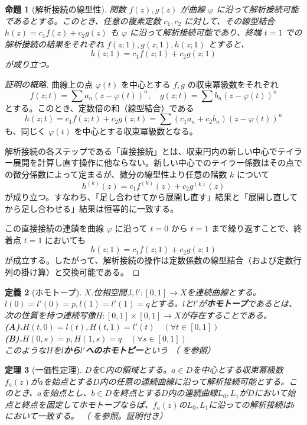\documentclass[paper=a4, fontsize=11pt]{jlreq} %
\theoremstyle{break}
\newtheorem{theorem}{定理}[section]
\newtheorem{definition}[theorem]{定義}
\newtheorem{proposition}[theorem]{命題}
\theoremstyle{qa}
\theoremstyle{remark} %
\begin{document}
\begin{proposition}[解析接続の線型性]\label{prop:analytic_linear}
    関数 $f(z), g(z)$ が曲線 $\varphi$ に沿って解析接続可能であるとする。このとき、任意の複素定数 $c_1, c_2$ に対して、その線型結合 $h(z) = c_1f(z) + c_2g(z)$ も $\varphi$ に沿って解析接続可能であり、終端 $t=1$ での解析接続の結果をそれぞれ $f(z;1), g(z;1), h(z;1)$ とすると、
    $$ h(z;1) = c_1f(z;1) + c_2g(z;1) $$
    が成り立つ。
\end{proposition}

\begin{proof}[証明の概略]
    曲線上の点 $\varphi(t)$ を中心とする $f, g$ の収束冪級数をそれぞれ
    $$ f(z; t) = \sum a_n (z - \varphi(t))^n, \quad g(z; t) = \sum b_n (z - \varphi(t))^n $$
    とする。このとき、定数倍の和（線型結合）である
    $$ h(z; t) = c_1f(z; t) + c_2g(z; t) = \sum (c_1a_n + c_2b_n)(z - \varphi(t))^n $$
    も、同じく $\varphi(t)$ を中心とする収束冪級数となる。
    
    解析接続の各ステップである「直接接続」とは、収束円内の新しい中心でテイラー展開を計算し直す操作に他ならない。新しい中心でのテイラー係数はその点での微分係数によって定まるが、微分の線型性より任意の階数 $k$ について
    $$ h^{(k)}(z) = c_1f^{(k)}(z) + c_2g^{(k)}(z) $$
    が成り立つ。すなわち、「足し合わせてから展開し直す」結果と「展開し直してから足し合わせる」結果は恒等的に一致する。
    
    この直接接続の連鎖を曲線 $\varphi$ に沿って $t=0$ から $t=1$ まで繰り返すことで、終着点 $t=1$ においても
    $$ h(z; 1) = c_1f(z; 1) + c_2g(z; 1) $$
    が成立する。したがって、解析接続の操作は定数係数の線型結合（および定数行列の掛け算）と交換可能である。
\end{proof}
\begin{definition}[ホモトープ]\label{def:homotope}
    $X$:位相空間,$l,l':[0,1]\to X$を連続曲線とする。$l(0)=l'(0)=p,l(1)=l'(1)=q$とする。$l$と$l'$が\textbf{ホモトープ}であるとは、次の性質を持つ連続写像$H:[0,1]\times[0,1]\to X$が存在することである。\\
    \textbf{(A).}$H(t,0)=l(t),H(t,1)=l'(t)\quad (\forall t \in[0,1])$\\
    \textbf{(B).}$H(0,s)=p,H(1,s)=q \quad  (\forall s \in[0,1])$\\
    このような$H$を\textbf{$l$から$l'$へのホモトピー}という
    （\cite[p.121 定義9.1]{book:matsumoto} を参照）
\end{definition}
\begin{theorem}[一価性定理]\label{thm:monodromy}
    $D$を$\mathbb{C}$内の領域とする。$a\in D$を中心とする収束冪級数$f_{a}(z)$が$a$を始点とする$D$内の任意の連続曲線に沿って解析接続可能とする。このとき、$a$を始点とし、$b\in D$を終点とする$D$内の連続曲線$L_{0},L_{1}$が$D$において始点と終点を固定してホモトープならば、$f_{a}(z)$の$L_{0},L_{1}$に沿っての解析接続は$b$において一致する。
    （\cite[p.110 定理22.2]{book:kimura} を参照。証明付き）
\end{theorem}
\end{document}
